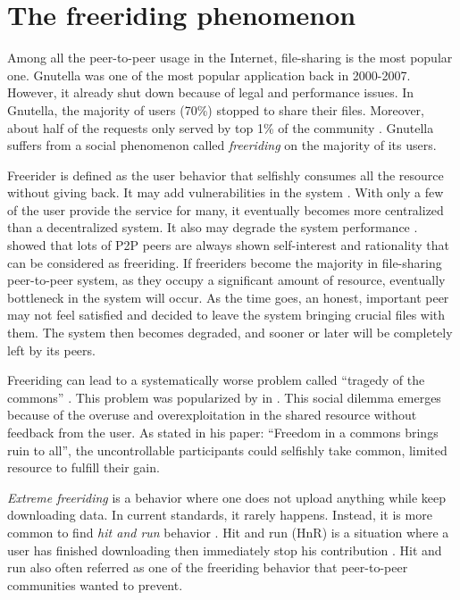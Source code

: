 \section{The freeriding phenomenon}
Among all the peer-to-peer usage in the Internet, file-sharing is the most popular one. Gnutella was one of the most popular application back in 2000-2007. However, it already shut down because of legal and performance issues. In Gnutella, the majority of users (70\%) stopped to share their files. Moreover, about half of the requests only served by top 1\% of the community \cite{2000:freeridegnutella:adar}. Gnutella suffers from a social phenomenon called \textit{freeriding} on the majority of its users.

Freerider is defined as the user behavior that selfishly consumes all the resource without giving back. It may add vulnerabilities in the system \cite{2000:freeridegnutella:adar}. With only a few of the user provide the service for many, it eventually becomes more centralized than a decentralized system. It also may degrade the system performance \cite{2000:freeridegnutella:adar}. \citeauthor{2000:freeridegnutella:adar} showed that lots of P2P peers are always shown self-interest and rationality that can be considered as freeriding. If freeriders become the majority in file-sharing peer-to-peer system, as they occupy a significant amount of resource, eventually bottleneck in the system will occur. As the time goes, an honest, important peer may not feel satisfied and decided to leave the system bringing crucial files with them. The system then becomes degraded, and sooner or later will be completely left by its peers.

Freeriding can lead to a systematically worse problem called ``tragedy of the commons'' \cite{1968:tragedycommon:hardin}. This problem was popularized by \citet*{1968:tragedycommon:hardin} in \citeyear{1968:tragedycommon:hardin}. This social dilemma emerges because of the overuse and overexploitation in the shared resource without feedback from the user. As \citeauthor{1968:tragedycommon:hardin} stated in his paper: ``Freedom in a commons brings ruin to all'', the uncontrollable participants could selfishly take common, limited resource to fulfill their gain.

\textit{Extreme freeriding} is a behavior where one does not upload anything while keep downloading data. In current standards, it rarely happens. Instead, it is more common to find \textit{hit and run} behavior \cite{2011:managesupplydemand:meulpolder}. Hit and run (HnR) is a situation where a user has finished downloading then immediately stop his contribution \cite{2014:sustainabilitytorrent:chen}. Hit and run also often referred as one of the freeriding behavior that peer-to-peer communities wanted to prevent. 

